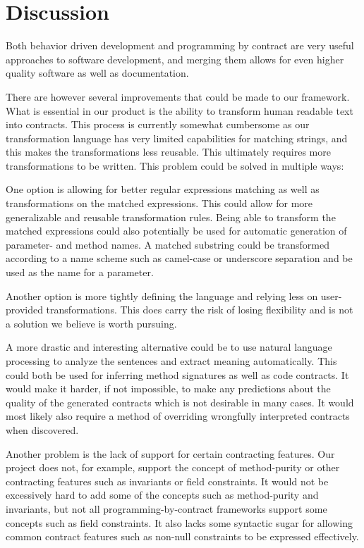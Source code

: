 \section{Discussion}
Both behavior driven development and programming by contract are very useful approaches to software development, and merging them allows for even higher quality software as well as documentation.

There are however several improvements that could be made to our framework.
What is essential in our product is the ability to transform human readable text into contracts.
This process is currently somewhat cumbersome as our transformation language has very limited capabilities for matching strings, and this makes the transformations less reusable.
This ultimately requires more transformations to be written.
This problem could be solved in multiple ways: 

One option is allowing for better regular expressions matching as well as transformations on the matched expressions.
This could allow for more generalizable and reusable transformation rules.
Being able to transform the matched expressions could also potentially be used for automatic generation of parameter- and method names.
A matched substring could be transformed according to a name scheme such as camel-case or underscore separation and be used as the name for a parameter.

Another option is more tightly defining the language and relying less on user-provided transformations.
This does carry the risk of losing flexibility and is not a solution we believe is worth pursuing.

A more drastic and interesting alternative could be to use natural language processing \cite{jurafsky2002speech} to analyze the sentences and extract meaning automatically.
This could both be used for inferring method signatures as well as code contracts.
It would make it harder, if not impossible, to make any predictions about the quality of the generated contracts which is not desirable in many cases.
It would most likely also require a method of overriding wrongfully interpreted contracts when discovered.

Another problem is the lack of support for certain contracting features.
Our project does not, for example, support the concept of method-purity or other contracting features such as invariants or field constraints.
It would not be excessively hard to add some of the concepts such as method-purity and invariants, but not all programming-by-contract frameworks support some concepts such as field constraints.
It also lacks some syntactic sugar for allowing common contract features such as non-null constraints to be expressed effectively.

